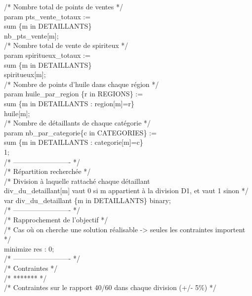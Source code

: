 \documentclass[a4paper,12pt,oneside]{report}
\begin{document}
/* Nombre total de points de ventes */\\
param pts\_vente\_totaux :=\\
	sum \{m in DETAILLANTS\}\\
	nb\_pts\_vente[m];\\

/* Nombre total de vente de spiriteux */\\
param spiritueux\_totaux :=\\
	sum \{m in DETAILLANTS\}\\
	spiritueux[m];\\

/* Nombre de points d'huile dans chaque région */\\
param huile\_par\_region \{r in REGIONS\} :=\\
	sum \{m in DETAILLANTS : region[m]=r\}\\
	huile[m];\\

/* Nombre de détaillants de chaque catégorie */\\
param nb\_par\_categorie\{c in CATEGORIES\} :=\\
	sum \{m in DETAILLANTS : categorie[m]=c\}\\
	1;\\

/* ------------------------- */\\
/* Répartition recherchée */\\

/* Division à laquelle rattaché chaque détaillant\\
div\_du\_detaillant[m] vaut 0 si m appartient à la division D1, et vaut 1 sinon */\\
var div\_du\_detaillant \{m in DETAILLANTS\} binary;\\

/* ------------------------- */\\
/* Rapprochement de l'objectif */\\

/* Cas où on cherche une solution réalisable -> seules les contraintes importent */\\
minimize res : 0;\\


/* ------------------------- */\\
/* Contraintes */\\

/* ******* */\\
/* Contraintes sur le rapport 40/60 dans chaque division (+/- 5\%) */\\
\end{document}
